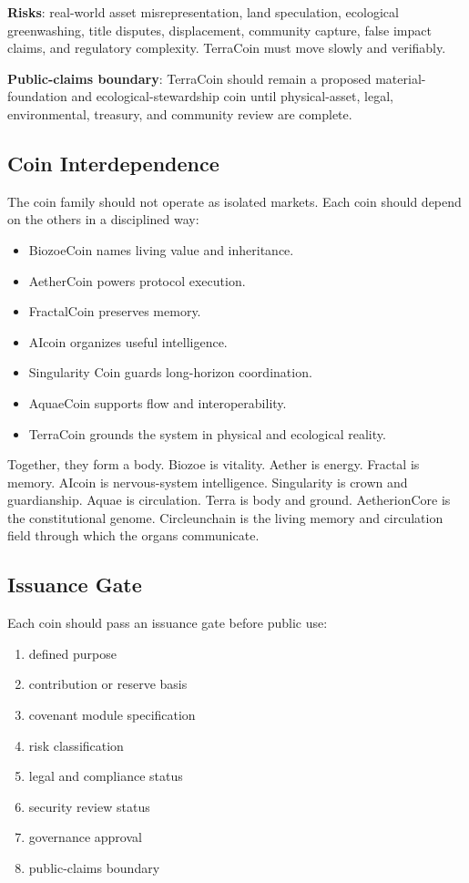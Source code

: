 \documentclass[12pt]{article}
\begin{document}
\textbf{Risks}: real-world asset misrepresentation, land speculation, ecological greenwashing, title disputes, displacement, community capture, false impact claims, and regulatory complexity. TerraCoin must move slowly and verifiably.

\textbf{Public-claims boundary}: TerraCoin should remain a proposed material-foundation and ecological-stewardship coin until physical-asset, legal, environmental, treasury, and community review are complete.

\subsection{Coin Interdependence}

The coin family should not operate as isolated markets. Each coin should depend on the others in a disciplined way:

\begin{itemize}
  \item BiozoeCoin names living value and inheritance.
  \item AetherCoin powers protocol execution.
  \item FractalCoin preserves memory.
  \item AIcoin organizes useful intelligence.
  \item Singularity Coin guards long-horizon coordination.
  \item AquaeCoin supports flow and interoperability.
  \item TerraCoin grounds the system in physical and ecological reality.
\end{itemize}

Together, they form a body. Biozoe is vitality. Aether is energy. Fractal is memory. AIcoin is nervous-system intelligence. Singularity is crown and guardianship. Aquae is circulation. Terra is body and ground. AetherionCore is the constitutional genome. Circleunchain is the living memory and circulation field through which the organs communicate.

\aftCoinOrganGraphic

\subsection{Issuance Gate}

Each coin should pass an issuance gate before public use:

\begin{enumerate}
  \item defined purpose
  \item contribution or reserve basis
  \item covenant module specification
  \item risk classification
  \item legal and compliance status
  \item security review status
  \item governance approval
  \item public-claims boundary
\end{enumerate}
\end{document}
